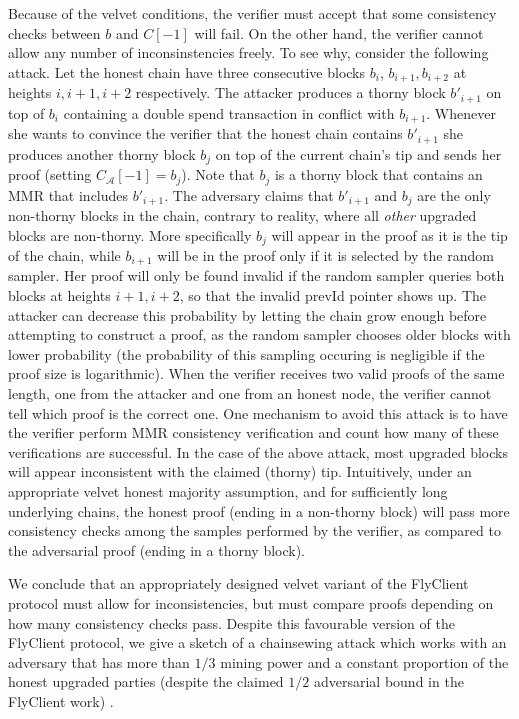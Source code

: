 	Because of the velvet conditions, the verifier must accept that some consistency checks between $b$ and $C[-1]$ will fail.
	On the other hand, the verifier cannot allow any number of inconsinstencies freely. To see why,
	consider the following attack. Let the honest chain have three consecutive blocks $b_i$, $b_{i+1}, b_{i+2}$ at heights $i, i+1, i+2$ respectively. The attacker produces a thorny block $b'_{i+1}$ on top of $b_i$ containing a double spend transaction in conflict with $b_{i+1}$.
	Whenever she wants to convince the verifier that the honest chain contains $b'_{i+1}$ she produces another thorny block $b_j$ on top of the current chain's tip and sends her proof (setting $C_\mathcal{A}[-1] = b_j$). Note that $b_j$ is a thorny block that contains an MMR that includes
	$b'_{i+1}$. The adversary claims that $b'_{i+1}$ and $b_j$ are the only non-thorny blocks in the chain, contrary to reality, where all \emph{other} upgraded blocks are non-thorny.
	More specifically $b_j$ will appear in the proof as it is the tip of the chain, while $b_{i+1}$ will be in the proof
	only if it is selected by the random sampler. Her proof will only be found invalid if the random sampler queries both blocks at heights $i+1, i+2$, so that the invalid prevId pointer shows up. The attacker can decrease this probability
	by letting the chain grow enough before attempting to construct a proof, as the random sampler chooses older blocks with lower probability (the probability of this sampling occuring is negligible if the proof size is logarithmic). When the verifier receives two valid proofs of the same length, one from the attacker and one from an honest node,
	the verifier cannot tell which proof is the correct one. One mechanism to avoid this attack is to have the verifier perform MMR consistency verification and count how many of
	these verifications are successful. In the case of the above attack, most upgraded blocks will appear inconsistent with the claimed (thorny) tip.
	Intuitively, under an appropriate velvet honest majority assumption, and for sufficiently long underlying chains, the honest proof (ending in a non-thorny block)
	will pass more consistency checks among the samples performed
	by the verifier, as compared to the adversarial proof (ending in a thorny block).

	We conclude that an appropriately designed velvet variant of the FlyClient protocol must allow for inconsistencies, but must compare proofs depending on how many
	consistency checks pass. Despite this favourable version of the FlyClient protocol, we give a sketch of a chainsewing attack which works
	with an adversary that has more than $1/3$ mining power and a constant proportion of the honest upgraded parties (despite the claimed $1/2$ adversarial bound in the FlyClient work) .

